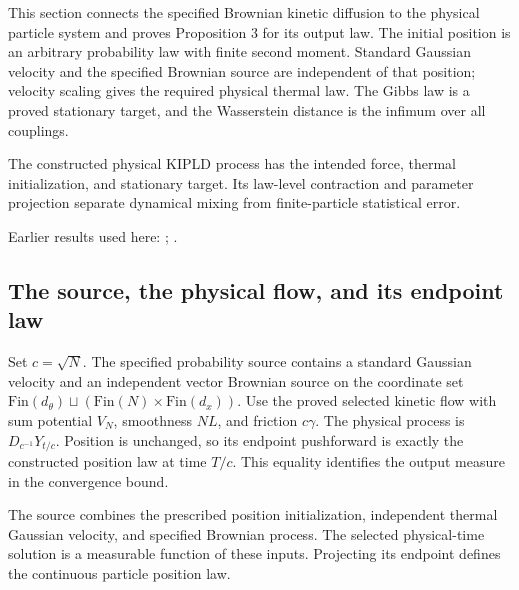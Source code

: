 \documentclass[11pt,a4paper]{report}
\begin{document}
This section connects the specified Brownian kinetic diffusion to the physical particle system and proves Proposition 3 for its output law. The initial position is an arbitrary probability law with finite second moment. Standard Gaussian velocity and the specified Brownian source are independent of that position; velocity scaling gives the required physical thermal law. The Gibbs law is a proved stationary target, and the Wasserstein distance is the infimum over all couplings.



The constructed physical KIPLD process has the intended force, thermal initialization, and stationary target. Its law-level contraction and parameter projection separate dynamical mixing from finite-particle statistical error.



Earlier results used here: \cite[Section~3.58]{LangevinLean2026Kinetic}; \cite[Section~3.115]{LangevinLean2026Kinetic}.
\subsection{\texorpdfstring{The source, the physical flow, and its endpoint law}{The source, the physical flow, and its endpoint law}}
\label{report-step-KIPLMC-Continuous-lean-1}


Set \(c=\sqrt N\). The specified probability source contains a standard Gaussian velocity and an independent vector Brownian source on the coordinate set \(\mathrm{Fin}(d_\theta)\sqcup(\mathrm{Fin}(N)\times\mathrm{Fin}(d_x))\). Use the proved selected kinetic flow with sum potential \(V_N\), smoothness \(NL\), and friction \(c\gamma\). The physical process is \(D_{c^{-1}}Y_{t/c}\). Position is unchanged, so its endpoint pushforward is exactly the constructed position law at time \(T/c\). This equality identifies the output measure in the convergence bound.



The source combines the prescribed position initialization, independent thermal Gaussian velocity, and specified Brownian process. The selected physical-time solution is a measurable function of these inputs. Projecting its endpoint defines the continuous particle position law.
\end{document}
